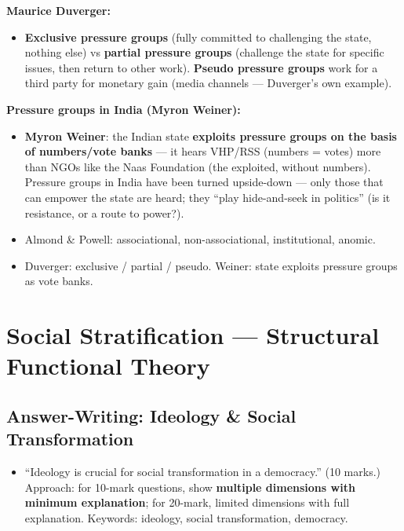 \begin{KeyConcept}
\textbf{Maurice Duverger:}
\begin{itemize}
\item \textbf{Exclusive pressure groups} (fully committed to challenging the state, nothing else) vs \textbf{partial pressure groups} (challenge the state for specific issues, then return to other work). \textbf{Pseudo pressure groups} work for a third party for monetary gain (media channels --- Duverger's own example).
\end{itemize}
\end{KeyConcept}

\begin{CriticalPoint}
\textbf{Pressure groups in India (Myron Weiner):}
\begin{itemize}
\item \textbf{Myron Weiner}: the Indian state \textbf{exploits pressure groups on the basis of numbers/vote banks} --- it hears VHP/RSS (numbers = votes) more than NGOs like the Naas Foundation (the exploited, without numbers). Pressure groups in India have been turned upside-down --- only those that can empower the state are heard; they ``play hide-and-seek in politics'' (is it resistance, or a route to power?).
\end{itemize}
\end{CriticalPoint}

\begin{QuickRevision}
\begin{itemize}
\item Almond \& Powell: associational, non-associational, institutional, anomic.
\item Duverger: exclusive / partial / pseudo. Weiner: state exploits pressure groups as vote banks.
\end{itemize}
\end{QuickRevision}

\sectiondivider

\section{Social Stratification --- Structural Functional Theory}

\subsection{Answer-Writing: Ideology \& Social Transformation}

\begin{PYQLink}
\begin{itemize}
\item ``Ideology is crucial for social transformation in a democracy.'' (10 marks.) Approach: for 10-mark questions, show \textbf{multiple dimensions with minimum explanation}; for 20-mark, limited dimensions with full explanation. Keywords: ideology, social transformation, democracy.
\end{itemize}
\end{PYQLink}

